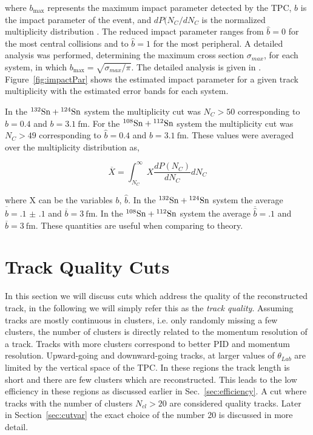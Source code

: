 where $b_{\mathrm{max}}$ represents the maximum impact parameter detected by the TPC, $b$ is the impact parameter of the event,  and $dP(N_C/dN_C$ is the normalized multiplicity distribution \cite{reducedimpact}. The reduced impact parameter ranges from $\hat{b}=0$ for the most central collisions and to $\hat{b}=1$ for the most peripheral. A  detailed analysis was performed, determining the maximum cross section $\sigma_{max}$, for each system, in which $b_{\mathrm{max}} = \sqrt{\sigma_{max}/\pi}$. The detailed analysis is given in \cite{jon}. Figure~\ref{fig:impactPar} shows the estimated impact parameter for a given track multiplicity with the estimated error bands for each system. 

In the ${}^{132}\mathrm{Sn} + {}^{124}\mathrm{Sn}$ system the multiplicity cut was $N_C > 50$ corresponding to $\hat{b} = 0.4$ and $b = \SI{3.1}{\femto\metre}$. For the ${}^{108}\mathrm{Sn} + {}^{112}\mathrm{Sn}$ system the multiplicity cut was $N_C > 49$ corresponding to $\hat{b} = 0.4$ and $b = \SI{3.1}{\femto\metre}$. These values were averaged over the multiplicity distribution as,

\begin{equation}
 \overline{X} = \int_{N_C}^{\infty} X\frac{dP(N_C)}{dN_C} dN_C
\end{equation}

where X can be the variables $b$, $\hat{b}$. In the ${}^{132}\mathrm{Sn} + {}^{124}\mathrm{Sn}$ system the average $\overline{\hat{b}} = \num{.1(1)}$ and $\overline{b} = \SI{3}{\femto\metre}$. In the ${}^{108}\mathrm{Sn} + {}^{112}\mathrm{Sn}$ system the average $\overline{\hat{b}} = .1$ and $\overline{b} = \SI{3}{\femto\metre}$. These quantities are useful when comparing to theory. 

\section{Track Quality Cuts}
\label{sec:qualitycut}
In this section we will discuss cuts which address the quality of the reconstructed track, in the following we will simply refer this as the \emph{track quality}. Assuming tracks are mostly continuous in clusters, i.e. only randomly missing a few clusters, the number of clusters is directly related to the momentum resolution of a track. Tracks with more clusters correspond to better PID and momentum resolution. Upward-going and downward-going tracks, at larger values of $\theta_{Lab}$ are limited by the vertical space of the TPC. In these regions the track length is short and there are few clusters which are reconstructed. This leads to the low efficiency in these regions as discussed earlier in Sec.~\ref{sec:efficiency}. A cut where tracks with the number of clusters $N_{cl} > 20$ are considered quality tracks. Later in Section~\ref{sec:cutvar} the exact choice of the number 20 is discussed in more detail.


